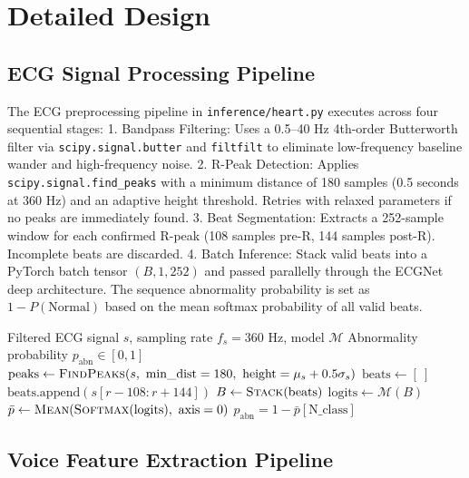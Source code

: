 \section{Detailed Design}

\subsection{ECG Signal Processing Pipeline}\label{sec:ecg_pipeline}

The ECG preprocessing pipeline in \texttt{inference/heart.py} executes across four sequential stages:
1. Bandpass Filtering: Uses a 0.5--40 Hz 4th-order Butterworth filter via \texttt{scipy.signal.butter} and \texttt{filtfilt} to eliminate low-frequency baseline wander and high-frequency noise.
2. R-Peak Detection: Applies \texttt{scipy.signal.find\_peaks} with a minimum distance of 180 samples (0.5 seconds at 360 Hz) and an adaptive height threshold. Retries with relaxed parameters if no peaks are immediately found.
3. Beat Segmentation: Extracts a 252-sample window for each confirmed R-peak (108 samples pre-R, 144 samples post-R). Incomplete beats are discarded.
4. Batch Inference: Stack valid beats into a PyTorch batch tensor $(B, 1, 252)$ and passed parallelly through the ECGNet deep architecture. The sequence abnormality probability is set as $1 - P(\text{Normal})$ based on the mean softmax probability of all valid beats.

\begin{algorithm}
\caption{ECG Beat Segmentation and Batch Inference}\label{alg:ecg}
\begin{algorithmic}
    \Require Filtered ECG signal $s$, sampling rate $f_s = 360$ Hz, model $\mathcal{M}$
    \Ensure Abnormality probability $p_{\text{abn}} \in [0, 1]$
    \State $\text{peaks} \gets \textsc{FindPeaks}(s,\ \text{min\_dist}=180,\ \text{height}=\mu_s + 0.5\sigma_s)$
    \State $\text{beats} \gets [\ ]$
            \State $\text{beats.append}(s[r-108 : r+144])$
        \EndIf
    \EndFor
    \State $B \gets \textsc{Stack}(\text{beats})$  
    \State $\text{logits} \gets \mathcal{M}(B)$
    \State $\bar{p} \gets \textsc{Mean}(\textsc{Softmax}(\text{logits}),\ \text{axis}=0)$
    \State \Return $p_{\text{abn}} = 1 - \bar{p}[\text{N\_class}]$
\end{algorithmic}
\end{algorithm}

\subsection{Voice Feature Extraction Pipeline}

